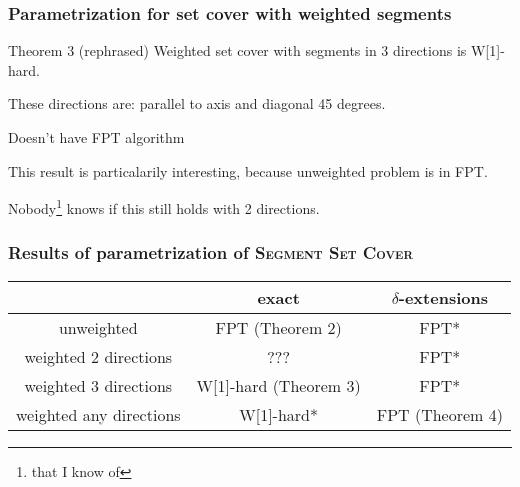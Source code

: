 \documentclass{beamer}
\begin{document}
\begin{frame}
\frametitle{Parametrization for set cover with weighted segments}
\begin{block}{Theorem 3 (rephrased)}
	Weighted set cover with segments in 3 directions is W[1]-hard.
	
	
These directions are: parallel to axis and diagonal 45 degrees.
	
	Doesn't have FPT algorithm
\end{block}


This result is particalarily interesting, because unweighted problem is in FPT.

Nobody\footnote{that I know of} knows if this still holds with
2 directions.

\end{frame}

\begin{frame}
\frametitle{Results of parametrization of \textsc{Segment Set Cover}}

\begin{tabular}{|c|c|c|}
\hline
           & exact & $\delta$-extensions \\
\hline
unweighted & \textcolor{olivegreen}{FPT (Theorem 2)} & \textcolor{olivegreen}{FPT*} \\
\hline
weighted 2 directions & ??? & \textcolor{olivegreen}{FPT*} \\
\hline
weighted 3 directions & \textcolor{olivegreen}{W[1]-hard (Theorem 3)} &  \textcolor{olivegreen}{FPT*}\\
\hline
weighted any directions & \textcolor{olivegreen}{W[1]-hard*} &  \textcolor{olivegreen}{FPT (Theorem 4)}\\
\hline
\end{tabular}

\end{frame}



\end{document}
